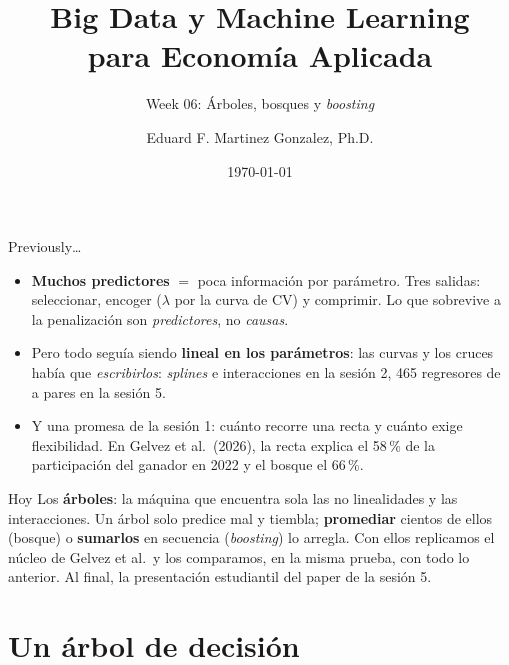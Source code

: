 \documentclass{beamer}
\title[BDML]{Big Data y Machine Learning \\ para Economía Aplicada}
\subtitle{Week 06: Árboles, bosques y \emph{boosting}}
\author{Eduard F. Martinez Gonzalez, Ph.D.}
\institute[]{Departamento de Economía, Universidad Icesi}
\date{\today}
\newcommand{\1}{\mathbb{I}}
\begin{document}
\begin{frame}
\titlepage
\end{frame}

\begin{frame}{Previously\ldots}
\small
\begin{itemize}\itemsep4pt
  \item \textbf{Muchos predictores} $=$ poca información por parámetro. Tres salidas: seleccionar, encoger ($\lambda$ por la curva de CV) y comprimir. Lo que sobrevive a la penalización son \emph{predictores}, no \emph{causas}. \pause
  \item Pero todo seguía siendo \textbf{lineal en los parámetros}: las curvas y los cruces había que \emph{escribirlos}: \emph{splines} e interacciones en la sesión 2, 465 regresores de a pares en la sesión 5. \pause
  \item Y una promesa de la sesión 1: cuánto recorre una recta y cuánto exige flexibilidad. En Gelvez et al.\ (2026), la recta explica el 58\,\% de la participación del ganador en 2022 y el bosque el 66\,\%.
\end{itemize}
\pause
\begin{block}{Hoy}
Los \textbf{árboles}: la máquina que encuentra sola las no linealidades y las interacciones. Un árbol solo predice mal y tiembla; \textbf{promediar} cientos de ellos (bosque) o \textbf{sumarlos} en secuencia (\emph{boosting}) lo arregla. Con ellos replicamos el núcleo de Gelvez et al.\ y los comparamos, en la misma prueba, con todo lo anterior. Al final, la presentación estudiantil del paper de la sesión 5.
\end{block}
\end{frame}


\section{Un árbol de decisión}
\begin{frame}[noframenumbering]
\tableofcontents[currentsection]
\end{frame}
\end{document}
